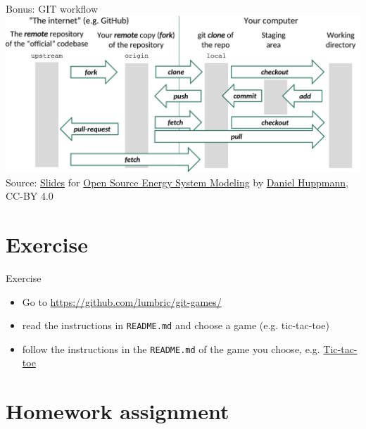 \begin{frame}[fragile]{Bonus: GIT workflow}
    \includegraphics[width=\textwidth]{images/git-workflow.pdf}
    \pause
    \vfill
    {\tiny Source:
    \href{https://data.ene.iiasa.ac.at/teaching/_static/osesm_summer2019/Lecture_1.pdf}{Slides} for
    \href{https://data.ene.iiasa.ac.at/teaching/#tu-vienna-summer-semester-2019-370-062}{Open Source Energy System Modeling}
    by \href{github.com/danielhuppmann}{Daniel Huppmann}, CC-BY 4.0
    }
\end{frame}



\section{Exercise}

\begin{frame}[fragile]{Exercise}
    \begin{itemize}
        \item Go to \href{https://github.com/lumbric/git-games/}{https://github.com/lumbric/git-games/}
        \item read the instructions in \verb|README.md| and choose a game (e.g. tic-tac-toe)
        \item follow the instructions in the \verb|README.md| of the game you choose, e.g.
            \href{https://github.com/lumbric/git-games/tree/master/tic-tac-toe#how-to-play}{Tic-tac-toe}

    \end{itemize}
\end{frame}


\section{Homework assignment}

